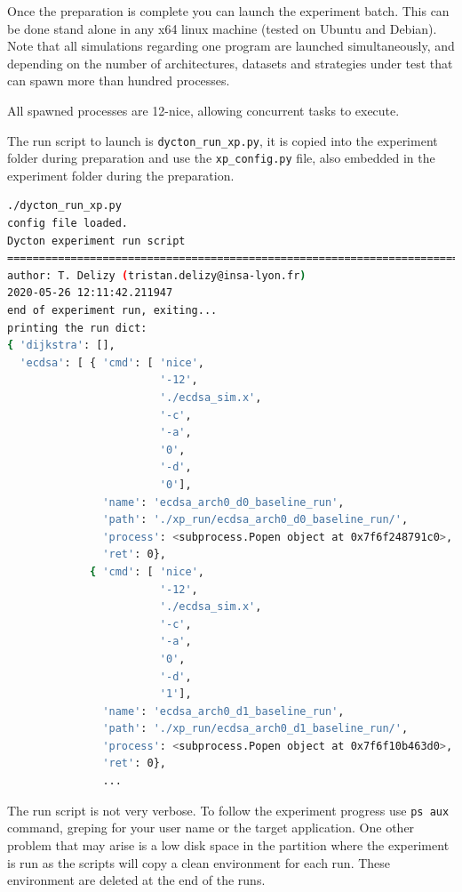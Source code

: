 \documentclass[10 pt]{article}
\begin{document}
Once the preparation is complete you can launch the experiment batch.
This can be done stand alone in any x64 linux machine (tested on Ubuntu and Debian).
Note that all simulations regarding one program are launched simultaneously, and depending on the number of architectures, datasets and strategies under test that can spawn more than hundred processes.

All spawned processes are 12-nice, allowing concurrent tasks to execute.

The run script to launch is \lstinline {dycton_run_xp.py}, it is copied into the experiment folder during preparation and use the \lstinline{xp_config.py} file, also embedded in the experiment folder during the preparation.

\begin{lstlisting}[language=bash]
./dycton_run_xp.py
config file loaded.
Dycton experiment run script
================================================================================
author: T. Delizy (tristan.delizy@insa-lyon.fr)
2020-05-26 12:11:42.211947
end of experiment run, exiting...
printing the run dict:
{ 'dijkstra': [],
  'ecdsa': [ { 'cmd': [ 'nice',
                        '-12',
                        './ecdsa_sim.x',
                        '-c',
                        '-a',
                        '0',
                        '-d',
                        '0'],
               'name': 'ecdsa_arch0_d0_baseline_run',
               'path': './xp_run/ecdsa_arch0_d0_baseline_run/',
               'process': <subprocess.Popen object at 0x7f6f248791c0>,
               'ret': 0},
             { 'cmd': [ 'nice',
                        '-12',
                        './ecdsa_sim.x',
                        '-c',
                        '-a',
                        '0',
                        '-d',
                        '1'],
               'name': 'ecdsa_arch0_d1_baseline_run',
               'path': './xp_run/ecdsa_arch0_d1_baseline_run/',
               'process': <subprocess.Popen object at 0x7f6f10b463d0>,
               'ret': 0},
               ...
\end{lstlisting}

The run script is not very verbose. To follow the experiment progress use \lstinline{ps aux} command, greping for your user name or the target application. One other problem that may arise is a low disk space in the partition where the experiment is run as the scripts will copy a clean environment for each run. These environment are deleted at the end of the runs.
\end{document}
